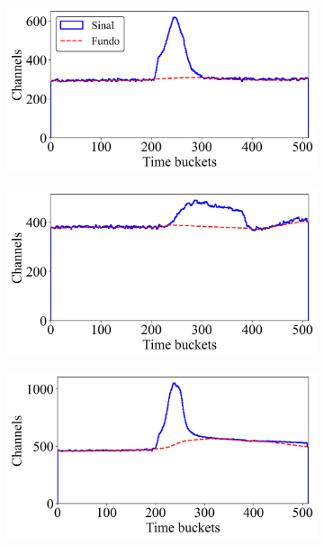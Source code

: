 \documentclass[a4paper,12pt,oneside]{book}
\begin{document}
\begin{figure}[H]
\centering
    \begin{subfigure}[b]{0.48\textwidth}
        \centering
        \includegraphics[scale=0.395]{figs/ex_sinal_bkg_1.png}
        \caption{}
        \label{subfig:ex_sinal_bkg_1}
    \end{subfigure}%
    \hfill
    \begin{subfigure}[b]{0.48\textwidth}
        \centering
        \includegraphics[scale=0.395]{figs/ex_sinal_bkg_2.png}
        \caption{}
        \label{subfig:ex_sinal_bkg_2}
    \end{subfigure}
    \begin{subfigure}[b]{0.48\textwidth}
        \centering
        \includegraphics[scale=0.395]{figs/ex_sinal_bkg_3.png}

\end{subfigure}
\end{figure}
\end{document}

